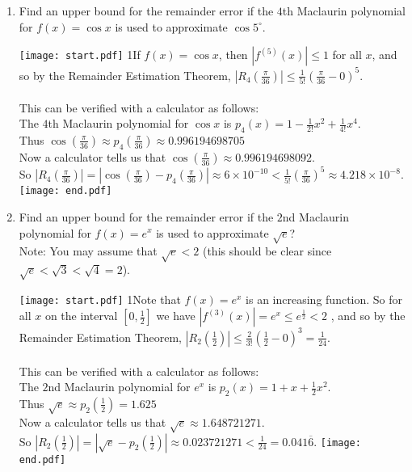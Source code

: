 \documentclass[12pt]{article}
\begin{document}
\begin{enumerate}

\item Find an upper bound for the remainder error if the $4$th Maclaurin polynomial for $f(x)=\cos{x}$ is used to approximate $\cos{5^\circ}$.



\texttt{[image: start.pdf]}
{{{1\linewidth}{If $f(x)=\cos{x}$, then $\textstyle|f^{(5)}(x)| \leq 1$ for all $x$, and so by the Remainder Estimation Theorem, $\textstyle |R_4(\frac{\pi}{36})| \leq \frac{1}{5!} \left(\frac{\pi}{36} - 0 \right)^5$.
\\ \\ This can be verified with a calculator as follows: \\ The $4$th Maclaurin polynomial for $\cos{x}$ is $\textstyle p_4(x)=1-\frac{1}{2!}x^2+\frac{1}{4!}x^4$.  
\\  Thus $\textstyle \cos{\left(\frac{\pi}{36}\right)} \approx p_4\left(\frac{\pi}{36}\right) \approx 0.996194698705$
\\ Now a calculator tells us that $\textstyle \cos{\left(\frac{\pi}{36}\right)} \approx 0.996194698092$.
\\ So $\textstyle |R_4(\frac{\pi}{36})| = |\cos({\frac{\pi}{36}}) - p_4(\frac{\pi}{36})| \approx 6 \times 10^{-10} < \frac{1}{5!} \left(\frac{\pi}{36}\right)^5 \approx 4.218 \times 10^{-8}$. 
   }}}
\texttt{[image: end.pdf]}


\item Find an upper bound for the remainder error if the $2$nd Maclaurin polynomial for $f(x)=e^x$ is used to approximate $\sqrt{e}$?  
\\ Note: You may assume that $\sqrt{e} < 2$ (this should be clear since $\sqrt{e}<\sqrt{3}<\sqrt{4}=2$). 

\texttt{[image: start.pdf]}
{{{1\linewidth}{Note that $f(x)=e^x$ is an increasing function.  So for all $x$ on the interval $\textstyle [0, \frac{1}{2}]$  we have $|f^{(3)}(x)| = e^x \leq e^{\frac{1}{2}} < 2$
, and so by the Remainder Estimation Theorem, $\textstyle |R_2(\frac{1}{2})| \leq \frac{2}{3!} \left(\frac{1}{2} - 0 \right)^3 = \frac{1}{24}$.
\\ \\ This can be verified with a calculator as follows: \\ The $2$nd Maclaurin polynomial for $e^x$ is $\textstyle p_2(x)=1+x+\frac{1}{2}x^2$.  
\\  Thus $\textstyle \sqrt{e} \approx p_2(\frac{1}{2}) = 1.625$
\\ Now a calculator tells us that $\textstyle \sqrt{e} \approx 1.648721271$.
\\ So $\textstyle |R_2(\frac{1}{2})| = |\sqrt{e} - p_2(\frac{1}{2})| \approx 0.023721271 < \frac{1}{24} = 0.041\overline{6}$. 
   }}}
\texttt{[image: end.pdf]}



\end{enumerate}
\end{document}

